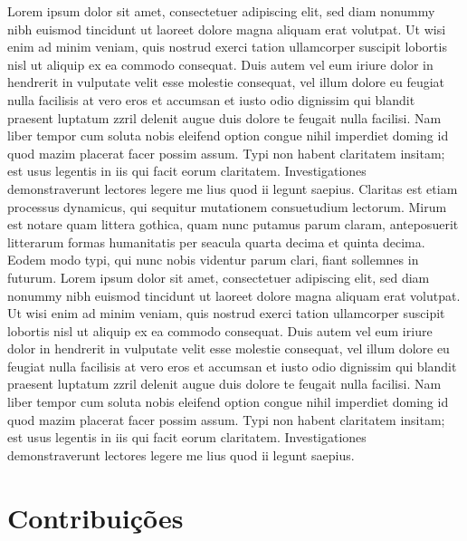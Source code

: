 Lorem ipsum dolor sit amet, consectetuer adipiscing elit, sed diam nonummy nibh euismod tincidunt ut laoreet dolore magna aliquam erat volutpat. Ut wisi enim ad minim veniam, quis nostrud exerci tation ullamcorper suscipit lobortis nisl ut aliquip ex ea commodo consequat. Duis autem vel eum iriure dolor in hendrerit in vulputate velit esse molestie consequat, vel illum dolore eu feugiat nulla facilisis at vero eros et accumsan et iusto odio dignissim qui blandit praesent luptatum zzril delenit augue duis dolore te feugait nulla facilisi. Nam liber tempor cum soluta nobis eleifend option congue nihil imperdiet doming id quod mazim placerat facer possim assum. Typi non habent claritatem insitam; est usus legentis in iis qui facit eorum claritatem. Investigationes demonstraverunt lectores legere me lius quod ii legunt saepius. Claritas est etiam processus dynamicus, qui sequitur mutationem consuetudium lectorum. Mirum est notare quam littera gothica, quam nunc putamus parum claram, anteposuerit litterarum formas humanitatis per seacula quarta decima et quinta decima. Eodem modo typi, qui nunc nobis videntur parum clari, fiant sollemnes in futurum. Lorem ipsum dolor sit amet, consectetuer adipiscing elit, sed diam nonummy nibh euismod tincidunt ut laoreet dolore magna aliquam erat volutpat. Ut wisi enim ad minim veniam, quis nostrud exerci tation ullamcorper suscipit lobortis nisl ut aliquip ex ea commodo consequat. Duis autem vel eum iriure dolor in hendrerit in vulputate velit esse molestie consequat, vel illum dolore eu feugiat nulla facilisis at vero eros et accumsan et iusto odio dignissim qui blandit praesent luptatum zzril delenit augue duis dolore te feugait nulla facilisi. Nam liber tempor cum soluta nobis eleifend option congue nihil imperdiet doming id quod mazim placerat facer possim assum. Typi non habent claritatem insitam; est usus legentis in iis qui facit eorum claritatem. Investigationes demonstraverunt lectores legere me lius quod ii legunt saepius.

\section{Contribuições}

